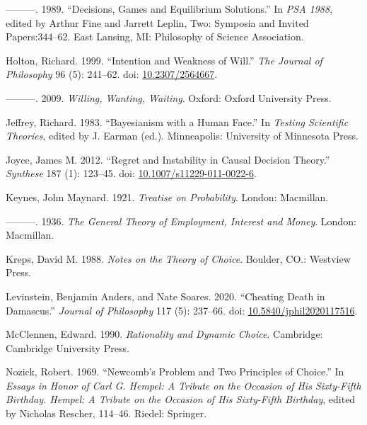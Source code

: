 \documentclass[
  10pt,
  letterpaper,
  DIV=11,
  numbers=noendperiod,
  twoside]{scrartcl}
\newlength{\cslhangindent}
\newenvironment{CSLReferences}[2] %
 {\begin{list}{}{%
  \setlength{\itemindent}{0pt}
  \setlength{\leftmargin}{0pt}
  \setlength{\parsep}{0pt}
  \ifodd #1
   \setlength{\leftmargin}{\cslhangindent}
   \setlength{\itemindent}{-1\cslhangindent}
  \fi
  \setlength{\itemsep}{#2\baselineskip}}}
 {\end{list}}
\begin{document}
\begin{CSLReferences}{1}{0}
---------. 1989. {``Decisions, Games and Equilibrium Solutions.''} In
\emph{PSA 1988}, edited by Arthur Fine and Jarrett Leplin, Two: Symposia
and Invited Papers:344--62. East Lansing, MI: Philosophy of Science
Association.

Holton, Richard. 1999. {``Intention and Weakness of Will.''} \emph{The
Journal of Philosophy} 96 (5): 241--62. doi:
\href{https://doi.org/10.2307/2564667}{10.2307/2564667}.

---------. 2009. \emph{Willing, Wanting, Waiting}. Oxford: Oxford
University Press.

Jeffrey, Richard. 1983. {``Bayesianism with a Human Face.''} In
\emph{Testing Scientific Theories}, edited by J. Earman (ed.).
Minneapolis: University of Minnesota Press.

Joyce, James M. 2012. {``Regret and Instability in Causal Decision
Theory.''} \emph{Synthese} 187 (1): 123--45. doi:
\href{https://doi.org/10.1007/s11229-011-0022-6}{10.1007/s11229-011-0022-6}.

Keynes, John Maynard. 1921. \emph{Treatise on Probability}. London:
Macmillan.

---------. 1936. \emph{The General Theory of Employment, Interest and
Money}. London: Macmillan.

Kreps, David M. 1988. \emph{Notes on the Theory of Choice}. Boulder,
CO.: Westview Press.

Levinstein, Benjamin Anders, and Nate Soares. 2020. {``Cheating Death in
Damascus.''} \emph{Journal of Philosophy} 117 (5): 237--66. doi:
\href{https://doi.org/10.5840/jphil2020117516}{10.5840/jphil2020117516}.

McClennen, Edward. 1990. \emph{Rationality and Dynamic Choice}.
Cambridge: {C}ambridge {U}niversity {P}ress.

Nozick, Robert. 1969. {``Newcomb's Problem and Two Principles of
Choice.''} In \emph{Essays in Honor of Carl {G}. Hempel: A Tribute on
the Occasion of His Sixty-Fifth Birthday. Hempel: A Tribute on the
Occasion of His Sixty-Fifth Birthday}, edited by Nicholas Rescher,
114--46. Riedel: Springer.


\end{CSLReferences}
\end{document}
